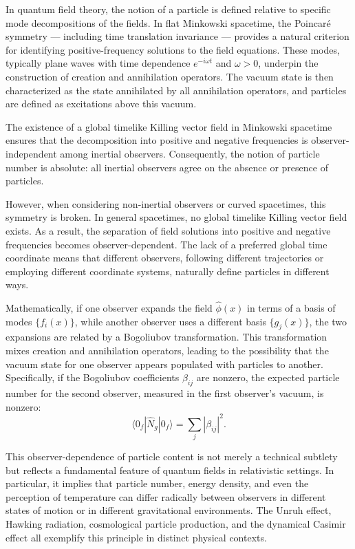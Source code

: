 In quantum field theory, the notion of a particle is defined relative to specific mode decompositions of the fields. In flat Minkowski spacetime, the Poincaré symmetry — including time translation invariance — provides a natural criterion for identifying positive-frequency solutions to the field equations. These modes, typically plane waves with time dependence $e^{-i\omega t}$ and $\omega > 0$, underpin the construction of creation and annihilation operators. The vacuum state is then characterized as the state annihilated by all annihilation operators, and particles are defined as excitations above this vacuum.

The existence of a global timelike Killing vector field in Minkowski spacetime ensures that the decomposition into positive and negative frequencies is observer-independent among inertial observers. Consequently, the notion of particle number is absolute: all inertial observers agree on the absence or presence of particles.

However, when considering non-inertial observers or curved spacetimes, this symmetry is broken. In general spacetimes, no global timelike Killing vector field exists. As a result, the separation of field solutions into positive and negative frequencies becomes observer-dependent. The lack of a preferred global time coordinate means that different observers, following different trajectories or employing different coordinate systems, naturally define particles in different ways.

Mathematically, if one observer expands the field $\hat{\phi}(x)$ in terms of a basis of modes $\{f_i(x)\}$, while another observer uses a different basis $\{g_j(x)\}$, the two expansions are related by a Bogoliubov transformation. This transformation mixes creation and annihilation operators, leading to the possibility that the vacuum state for one observer appears populated with particles to another. Specifically, if the Bogoliubov coefficients $\beta_{ij}$ are nonzero, the expected particle number for the second observer, measured in the first observer's vacuum, is nonzero:
\[
\langle 0_f | \hat{N}_g | 0_f \rangle = \sum_j |\beta_{ij}|^2.
\]

This observer-dependence of particle content is not merely a technical subtlety but reflects a fundamental feature of quantum fields in relativistic settings. In particular, it implies that particle number, energy density, and even the perception of temperature can differ radically between observers in different states of motion or in different gravitational environments. The Unruh effect, Hawking radiation, cosmological particle production, and the dynamical Casimir effect all exemplify this principle in distinct physical contexts.

